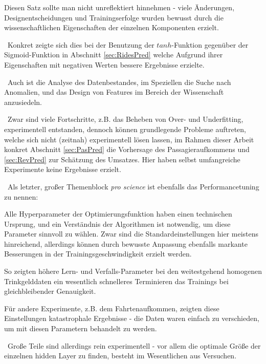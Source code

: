 Diesen Satz sollte man nicht unreflektiert hinnehmen - viele Änderungen, Designentscheidungen und Trainingserfolge wurden bewusst durch die wissenschaftlichen Eigenschaften der einzelnen Komponenten erzielt. 

~\newline  Konkret zeigte sich dies bei der Benutzung der $tanh$-Funktion gegenüber der Sigmoid-Funktion in Abschnitt \ref{sec:RidesPred} welche Aufgrund ihrer Eigenschaften mit negativen Werten bessere Ergebnisse erzielte. 

~\newline Auch ist die Analyse des Datenbestandes, im Speziellen die Suche nach Anomalien, und das Design von Features im Bereich der Wissenschaft anzusiedeln. 

~\newline Zwar sind viele Fortschritte, z.B. das Beheben von Over- und Underfitting, experimentell entstanden, dennoch können 
grundlegende Probleme auftreten, welche sich nicht (zeitnah) experimentell lösen lassen, im Rahmen dieser Arbeit konkret Abschnitt \ref{sec:PasPred} die Vorhersage des Passagieraufkommens und \ref{sec:RevPred} zur Schätzung des Umsatzes. Hier haben selbst umfangreiche Experimente keine Ergebnisse erzielt.

~\newline  Als letzter, großer Themenblock \textit{pro science} ist ebenfalls das Performancetuning zu nennen: 

Alle Hyperparameter der Optimierungsfunktion haben einen technischen Ursprung, und ein Verständnis der Algorithmen ist notwendig, um diese Parameter sinnvoll zu wählen. Zwar sind die Standardeinstellungen hier meistens hinreichend, allerdings können durch bewusste Anpassung ebenfalls markante Besserungen in der Trainingsgeschwindigkeit erzielt werden. 

So zeigten höhere Lern- und Verfalls-Parameter bei den weitestgehend homogenen Trinkgelddaten ein wesentlich schnelleres Terminieren das Trainings bei gleichbleibender Genauigkeit. 

Für andere Experimente, z.B. dem Fahrtenaufkommen, zeigten diese Einstellungen katastrophale Ergebnisse - die Daten waren einfach zu verschieden, um mit diesen Parametern behandelt zu werden. 

~\newline Große Teile sind allerdings rein experimentell - vor allem die optimale Größe der einzelnen hidden Layer zu finden, besteht im Wesentlichen aus Versuchen.

